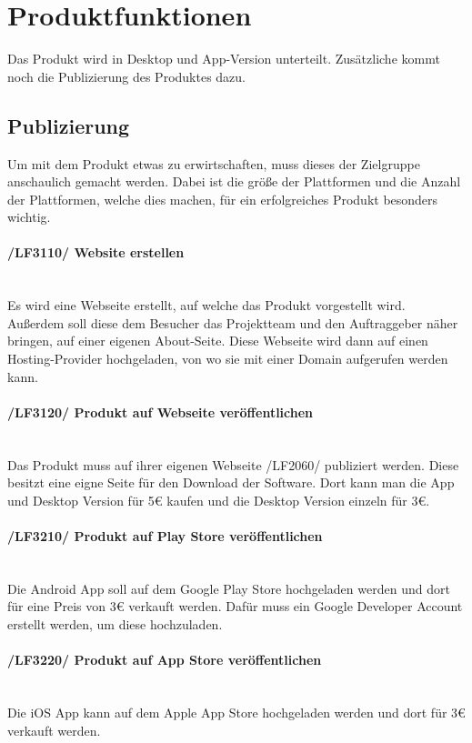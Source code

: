 \section{Produktfunktionen}
Das Produkt wird in Desktop und App-Version unterteilt. Zusätzliche kommt noch die Publizierung des Produktes dazu.




\subsection{Publizierung}
Um mit dem Produkt etwas zu erwirtschaften, muss dieses der Zielgruppe anschaulich gemacht werden. Dabei ist die größe der Plattformen und die Anzahl der Plattformen, welche dies machen, für ein erfolgreiches Produkt besonders wichtig. 
\begin{indentE}\mbox{}
	\paragraph{/LF3110/ Website erstellen}\mbox{}\\
	Es wird eine Webseite erstellt, auf welche das Produkt vorgestellt wird. Außerdem soll diese dem Besucher das Projektteam und den Auftraggeber näher bringen, auf einer eigenen About-Seite. Diese Webseite wird dann auf einen Hosting-Provider hochgeladen, von wo sie mit einer Domain aufgerufen werden kann.
	\paragraph{/LF3120/ Produkt auf Webseite veröffentlichen}\mbox{}\\
	Das Produkt muss auf ihrer eigenen Webseite /LF2060/ publiziert werden. Diese besitzt eine eigne Seite für den Download der Software. Dort kann man die App und Desktop Version für 5€ kaufen und die Desktop Version einzeln für 3€.
	\paragraph{/LF3210/ Produkt auf Play Store veröffentlichen}\mbox{}\\
	Die Android App soll auf dem Google Play Store hochgeladen werden und dort für eine Preis von 3€ verkauft werden. Dafür muss ein Google Developer Account erstellt werden, um diese hochzuladen.
	\paragraph{/LF3220/ Produkt auf App Store veröffentlichen}\mbox{}\\
	Die iOS App kann auf dem Apple App Store hochgeladen werden und dort für 3€ verkauft werden.
\end{indentE}